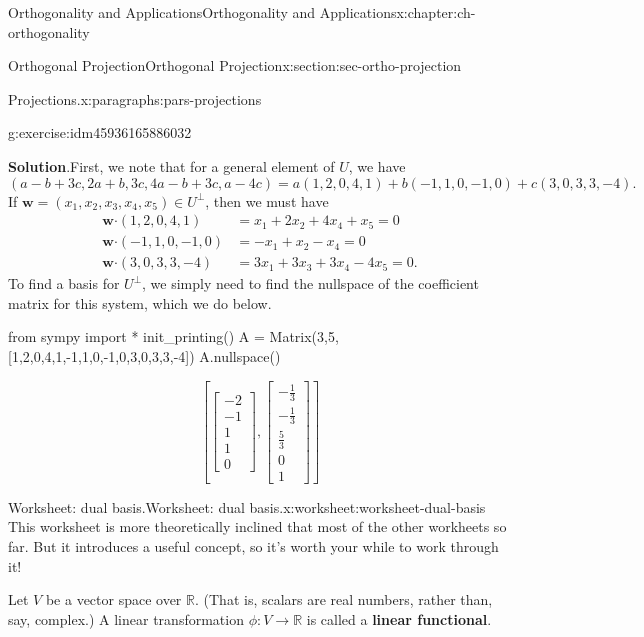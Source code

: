 \documentclass[oneside,10pt,]{book}
\newcommand{\blocktitlefont}{\relax}
\newcommand{\terminology}[1]{\textbf{#1}}
\numberwithin{equation}{section}
\newcommand{\bbm}{\begin{bmatrix}}
\newcommand{\ebm}{\end{bmatrix}}
\newcommand{\R}{\mathbb{R}}
\newcommand{\dotp}{\!\boldsymbol{\cdot}\!}
\newcommand{\ww}{\mathbf{w}}
\newcommand{\amp}{&}
\begin{document}
\begin{chapterptx}{Orthogonality and Applications}{}{Orthogonality and Applications}{}{}{x:chapter:ch-orthogonality}
\begin{sectionptx}{Orthogonal Projection}{}{Orthogonal Projection}{}{}{x:section:sec-ortho-projection}
\begin{paragraphs}{Projections.}{x:paragraphs:pars-projections}
\begin{inlineexercise}{}{g:exercise:idm45936165886032}
\par\smallskip%
\noindent\textbf{\blocktitlefont Solution}.\label{g:solution:idm45936165875696}{}\hypertarget{g:solution:idm45936165875696}{}\quad{}First, we note that for a general element of \(U\), we have%
\begin{equation*}
(a-b+3c, 2a+b, 3c, 4a-b+3c,a-4c) = a(1,2,0,4,1)+b(-1,1,0,-1,0)+c(3,0,3,3,-4)\text{.}
\end{equation*}
If \(\ww = (x_1,x_2,x_3,x_4,x_5)\in U^\bot\), then we must have%
\begin{align*}
\ww\dotp (1,2,0,4,1) \amp = x_1+2x_2+4x_4+x_5=0 \\
\ww\dotp (-1,1,0,-1,0) \amp =-x_1+x_2-x_4=0\\
\ww\dotp (3,0,3,3,-4) \amp =3x_1+3x_3+3x_4-4x_5 = 0\text{.}
\end{align*}
To find a basis for \(U^\bot\), we simply need to find the nullspace of the coefficient matrix for this system, which we do below.%
\begin{sageinput}
from sympy import *
init_printing()
A = Matrix(3,5,[1,2,0,4,1,-1,1,0,-1,0,3,0,3,3,-4])
A.nullspace()
\end{sageinput}
\begin{sageoutput}
\[\left[\bbm -2\\-1\\1\\1\\0\ebm, \bbm -\frac13\\ -\frac13\\ \frac53\\0\\1\ebm\right]\]
\end{sageoutput}
\end{inlineexercise}%
\end{paragraphs}%
\end{sectionptx}
%
%
\typeout{************************************************}
\typeout{************************************************}
%
\begin{worksheet-section}{Worksheet: dual basis.}{}{Worksheet: dual basis.}{}{}{x:worksheet:worksheet-dual-basis}
This worksheet is more theoretically inclined that most of the other workheets so far. But it introduces a useful concept, so it's worth your while to work through it!%
\par
Let \(V\) be a vector space over \(\R\). (That is, scalars are real numbers, rather than, say, complex.) A linear transformation \(\phi:V\to \R\) is called a \terminology{linear functional}.%

\end{worksheet-section}
\end{chapterptx}
\end{document}
